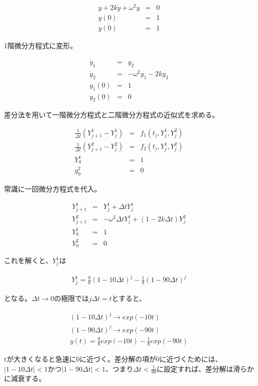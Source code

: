 \documentclass[]{jsarticle}
\begin{document}
\begin{eqnarray*}
\ddot{y} + 2k\dot{y} + \omega ^{2} y &=& 0 \\
y(0) &=& 1 \\
\dot{y}(0) &=& 1
\end{eqnarray*}

1階微分方程式に変形。

\begin{eqnarray*}
\dot{y}_{1} &=& y_{2}\\
\dot{y}_{2} &=& - \omega ^{2} y_{1} - 2k y_{2}\\
y_{1}(0) &=& 1\\
y_{2}(0) &=& 0 
\end{eqnarray*}

差分法を用いて一階微分方程式と二階微分方程式の近似式を求める。

\begin{eqnarray*}
\frac{1}{\Delta t}(Y^{1}_{j+1} - Y^{1}_{j}) &=& f_{1}(t_{j}, Y_{j}^{1}, Y_{j}^{2})\\
\frac{1}{\Delta t}(Y^{2}_{j+1} - Y^{2}_{j}) &=& f_{2}(t_{j}, Y_{j}^{1}, Y_{j}^{2})\\
Y^{1}_{0} &=& 1\\
y^{2}_{0} &=& 0 
\end{eqnarray*}

常識に一回微分方程式を代入。

\begin{eqnarray*}
Y^{1}_{j+1} &=& Y^{1}_{j} + \Delta t Y_{j}^{1}\\
Y^{2}_{j+1} &=& -\omega^{2} \Delta t Y_{j}^{1} + (1-2k\Delta t)Y_{j}^{2}\\
Y_{0}^{1} &=& 1\\
Y_{0}^{2} &=& 0
\end{eqnarray*}

これを解くと、$Y_{j}^{1}$は

\begin{eqnarray*}
Y_{j}^{1} = \frac{9}{8} ( 1-10 \Delta t)^{j} - \frac{1}{8} ( 1- 90\Delta t)^{j} 
\end{eqnarray*}

となる。$\Delta t \to 0$の極限では$j\Delta t = t$とすると、

\begin{eqnarray*}
(1-10 \Delta t)^{j} \to exp(-10t)\\
(1-90 \Delta t)^{j} \to exp(-90t)\\
y(t) = \frac{9}{8} exp(-10t) - \frac{1}{8} exp (-90t)
\end{eqnarray*}

tが大きくなると急速に0に近づく。差分解の項が0に近づくためには、$|1 - 10 \Delta t| < 1$かつ$|1 - 90 \Delta t| < 1$、つまり$\Delta t < \frac{1}{90}$に設定すれば、差分解は滑らかに減衰する。
\end{document}
